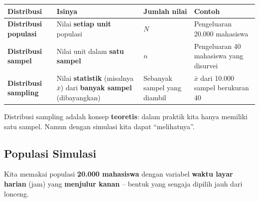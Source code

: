 \documentclass[
  indonesian,
  letterpaper,
]{book}
\newcounter{none} %
\begin{document}
{\def\LTcaptype{none} %
\begin{longtable}[]{@{}
  >{\raggedright\arraybackslash}p{}
  >{\raggedright\arraybackslash}p{}
  >{\raggedright\arraybackslash}p{}
  >{\raggedright\arraybackslash}p{}@{}}
\toprule\noalign{}
\begin{minipage}[b]{\linewidth}\raggedright
Distribusi
\end{minipage} & \begin{minipage}[b]{\linewidth}\raggedright
Isinya
\end{minipage} & \begin{minipage}[b]{\linewidth}\raggedright
Jumlah nilai
\end{minipage} & \begin{minipage}[b]{\linewidth}\raggedright
Contoh
\end{minipage} \\
\midrule\noalign{}
\endhead
\bottomrule\noalign{}
\endlastfoot
\textbf{Distribusi populasi} & Nilai \textbf{setiap unit} populasi &
\(N\) & Pengeluaran 20.000 mahasiswa \\
\textbf{Distribusi sampel} & Nilai unit dalam \textbf{satu sampel} &
\(n\) & Pengeluaran 40 mahasiswa yang disurvei \\
\textbf{Distribusi sampling} & Nilai \textbf{statistik} (misalnya
\(\bar{x}\)) dari \textbf{banyak sampel} (dibayangkan) & Sebanyak sampel
yang diambil & \(\bar{x}\) dari 10.000 sampel berukuran 40 \\
\end{longtable}
}

Distribusi sampling adalah konsep \textbf{teoretis}: dalam praktik kita
hanya memiliki satu sampel. Namun dengan simulasi kita dapat
``melihatnya''.

\subsection{Populasi Simulasi}\label{populasi-simulasi}

Kita memakai populasi \textbf{20.000 mahasiswa} dengan variabel
\textbf{waktu layar harian} (jam) yang \textbf{menjulur kanan} -- bentuk
yang sengaja dipilih jauh dari lonceng.
\end{document}

